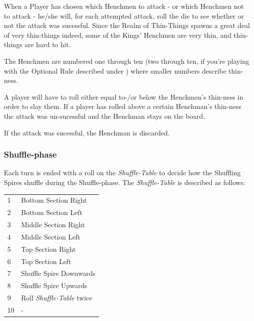 When a Player has chosen which Henchmen to attack - or which Henchmen not to attack - he/she will, for each attempted attack, roll the die to see whether or not the attack was sucessful.
Since the Realm of Thin-Things spawns a great deal of very thin-things indeed, some of the Kings' Henchmen are very thin, and thin-things are hard to hit.

The Henchmen are numbered one through ten (two through ten, if you're playing with the Optional Rule described under ) where smaller numbers describe thin-ness.

A player will have to roll either equal to-/or below the Henchmen's thin-ness in order to slay them.
If a player has rolled above a certain Henchman's thin-ness the attack was un-sucessful and the Henchman stays on the board.

If the attack was sucessful, the Henchman is discarded.

\subsubsection{Shuffle-phase}
\label{sec:playingshufflespires_shufflephase}
Each turn is ended with a roll on the \textit{Shuffle-Table} to decide how the Shuffling Spires shuffle during the Shuffle-phase.
The \textit{Shuffle-Table} is described as follows:

\begin{tabular}{ l l }
	1 & Bottom Section Right \\
	2 & Bottom Section Left \\
	3 & Middle Section Right \\
	4 & Middle Section Left \\
	5 & Top Section Right \\
	6 & Top Section Left \\
	7 & Shuffle Spire Downwards\\
	8 & Shuffle Spire Upwards \\
	9 &  Roll \textit{Shuffle-Table} twice\\
	10 & - \\
\end{tabular}

